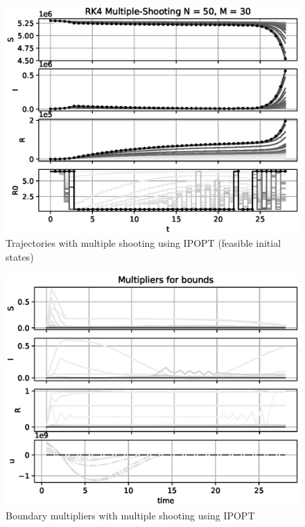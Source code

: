 \begin{figure}[H]
    \centering
    \includegraphics[width=.8\textwidth]{pythonProject/Figures/Multiple_Shooting_Trajectory_IPOPT.eps}
    \caption{Trajectories with multiple shooting using IPOPT (feasible initial states)}
    \label{fig:MS_Traj_IPOPT}
\end{figure}

\begin{figure}[H]
    \centering
    \includegraphics[width=.8\textwidth]{pythonProject/Figures/Multiple_Shooting_bounds_IPOPT.eps}
    \caption{Boundary multipliers with multiple shooting using IPOPT}
    \label{fig:MS_Bounds_IPOPT}
\end{figure}



